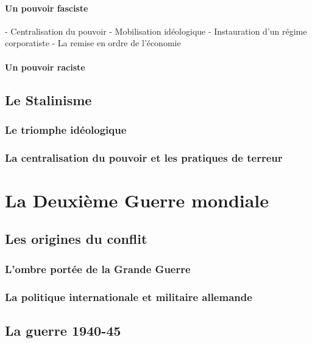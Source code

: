 \documentclass[12pt]{report}
\begin{document}
\subsubsection{Un pouvoir fasciste}

- Centralisation du pouvoir
- Mobilisation idéologique
- Instauration d’un régime corporatiste
- La remise en ordre de l’économie

\subsubsection{Un pouvoir raciste}

\section{Le Stalinisme}

\subsection{Le triomphe idéologique}

\subsection{La centralisation du pouvoir et les pratiques de terreur}



\chapter{La Deuxième Guerre mondiale}

\section{Les origines du conflit}

\subsection{L'ombre portée de la Grande Guerre}

\subsection{La politique internationale et militaire allemande}

\section{La guerre 1940-45}
\end{document}
